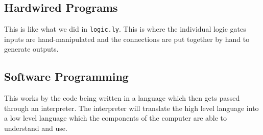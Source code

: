 \subsection*{Hardwired Programs}
This is like what we did in \texttt{logic.ly}. This is where the individual logic gates inputs are hand-manipulated and the connections are put together by hand to generate outputs.

\subsection*{Software Programming}
This works by the code being written in a language which then gets passed through an interpreter. The interpreter will translate the high level language into a low level language which the components of the computer are able to understand and use. 